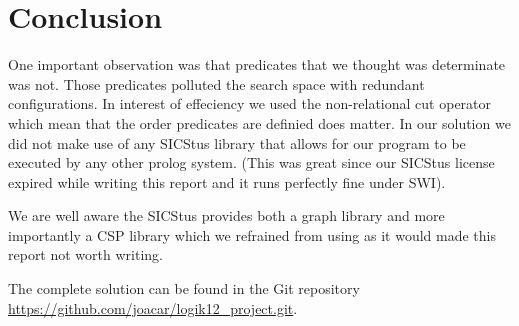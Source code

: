 \documentclass[a4paper,12pt]{article}
\begin{document}
\section*{Conclusion}
One important observation was that predicates that we thought was determinate was not. Those predicates polluted the search space with redundant configurations. In interest of effeciency we used the non-relational cut operator which mean that the order predicates are definied does matter.
In our solution we did not make use of any SICStus library that allows for our program to be executed by any other prolog system. (This was great since our SICStus license expired while writing this report and it runs perfectly fine under SWI).

We are well aware the SICStus provides both a graph library and more importantly a CSP library which we refrained from using as it would made this report not worth writing.


The complete solution can be found in the Git repository \url{https://github.com/joacar/logik12_project.git}.
\end{document}
